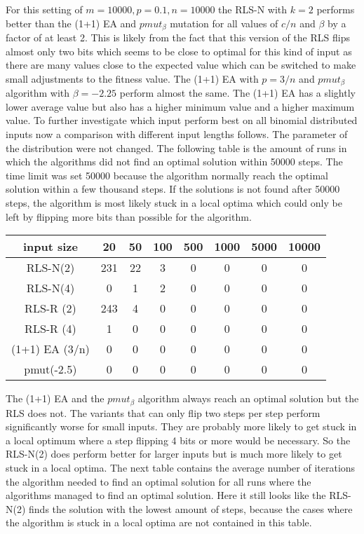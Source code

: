 For this setting of $m=10000, p=0.1, n=10000$ the RLS-N with $k=2$ performs better than the  (1+1) EA and $pmut_\beta$ mutation for all values of $c/n$ and $\beta$ by a factor of at least 2.
This is likely from the fact that this version of the RLS flips almost only two bits which seems to be close to optimal for this kind of input as there are many values close to the expected value which can be switched to make small adjustments to the fitness value.
The (1+1) EA with $p=3/n$ and $pmut_\beta$ algorithm with $\beta=-2.25$ perform almost the same.
The (1+1) EA has a slightly lower average value but also has a higher minimum value and a higher maximum value.
To further investigate which input perform best on all binomial distributed inputs now a comparison with different input lengths follows. The parameter of the distribution were not changed.
The following table is the amount of runs in which the algorithms did not find an optimal solution within 50000 steps.
The time limit was set 50000 because the algorithm normally reach the optimal solution within a few thousand steps.
If the solutions is not found after 50000 steps, the algorithm is most likely stuck in a local optima which could only be left by flipping more bits than possible for the algorithm.

\begin{tabular}{cccccccc}
      input size    & 20  & 50 & 100 & 500 & 1000 & 5000 & 10000 \\\hline
      RLS-N(2)      & 231 & 22 & 3   & 0   & 0    & 0    & 0     \\
      RLS-N(4)      & 0   & 1  & 2   & 0   & 0    & 0    & 0     \\
      RLS-R (2)      & 243 & 4  & 0   & 0   & 0    & 0    & 0     \\
      RLS-R (4)      & 1   & 0  & 0   & 0   & 0    & 0    & 0     \\
      (1+1) EA (3/n) & 0   & 0  & 0   & 0   & 0    & 0    & 0     \\
      pmut(-2.5)    & 0   & 0  & 0   & 0   & 0    & 0    & 0     \\
\end{tabular}

The (1+1) EA and the $pmut_\beta$ algorithm always reach an optimal solution but the RLS does not.
The variants that can only flip two steps per step perform significantly worse for small inputs.
They are probably more likely to get stuck in a local optimum where a step flipping 4 bits or more would be necessary.
So the RLS-N(2) does perform better for larger inputs but is much more likely to get stuck in a local optima.
The next table contains the average number of iterations the algorithm needed to find an optimal solution for all runs where the algorithms managed to find an optimal solution.
Here it still looks like the RLS-N(2) finds the solution with the lowest amount of steps, because the cases where the algorithm is stuck in a local optima are not contained in this table.

